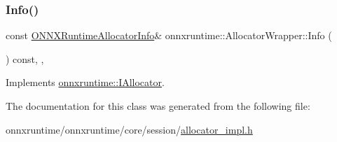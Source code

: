 \subsubsection{\texorpdfstring{Info()}{Info()}}
{\footnotesize\ttfamily const \mbox{\hyperlink{structONNXRuntimeAllocatorInfo}{O\+N\+N\+X\+Runtime\+Allocator\+Info}}\& onnxruntime\+::\+Allocator\+Wrapper\+::\+Info (\begin{DoxyParamCaption}{ }\end{DoxyParamCaption}) const\hspace{0.3cm}{\ttfamily [inline]}, {\ttfamily [override]}, {\ttfamily [virtual]}}



Implements \mbox{\hyperlink{classonnxruntime_1_1IAllocator_a384b9f03d2346999b7b9ce3b225982a3}{onnxruntime\+::\+I\+Allocator}}.



The documentation for this class was generated from the following file\+:\begin{DoxyCompactItemize}
\item 
onnxruntime/onnxruntime/core/session/\mbox{\hyperlink{allocator__impl_8h}{allocator\+\_\+impl.\+h}}\end{DoxyCompactItemize}
